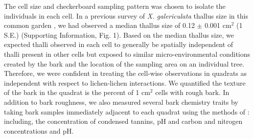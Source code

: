 \documentclass[fleqn,12pt]{olplainarticle}
\begin{document}
The cell size and checkerboard sampling pattern was chosen to isolate
the individuals in each cell. In a previous survey of
\textit{X. galericulata} thallus size in this common garden
\citep{Lamit2015a}, we had observed a median thallus size of 0.12
$\pm$ 0.001 cm$^2$ (1 S.E.)  (Supporting Information, Fig. 1). Based
on the median thallus size, we expected thalli observed in each cell
to generally be spatially independent of thalli present in other cells
but exposed to similar micro-environmental conditions created by the
bark and the location of the sampling area on an individual
tree. Therefore, we were confident in treating the cell-wise
observations in quadrats as independent with respect to lichen-lichen
interactions. We quantified the texture of the bark in the quadrat is
the percent of 1 cm$^2$ cells with rough bark. In addition to bark
roughness, we also measured several bark chemistry traits by taking
bark samples immediately adjacent to each quadrat using the methods of
\cite{Lamit2011}: including, the concentration of condensed tannins,
pH and carbon and nitrogen concentrations and pH.
\end{document}
